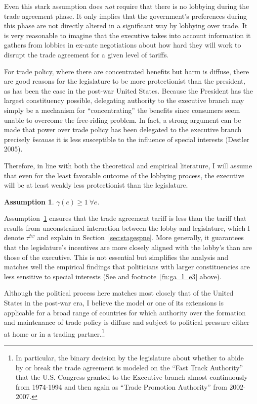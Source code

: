 \documentclass[authoryear, review]{elsarticle}
\newtheorem{assumption}{Assumption}
\newcommand{\ga}{\gamma}
\begin{document}
Even this stark assumption does \textit{not} require that there is no lobbying during the trade agreement phase. It only implies that the government's preferences during this phase are not directly altered in a significant way by lobbying over trade. It is very reasonable to imagine that the executive takes into account information it gathers from lobbies in ex-ante negotiations about how hard they will work to disrupt the trade agreement for a given level of tariffs.

For trade policy, where there are concentrated benefits but harm is diffuse, there are good reasons for the legislature to be more protectionist than the president, as has been the case in the post-war United States. Because the President has the largest constituency possible, delegating authority to the executive branch may simply be a mechanism for ``concentrating'' the benefits since consumers seem unable to overcome the free-riding problem. In fact, a strong argument can be made that power over trade policy has been delegated to the executive branch precisely \textit{because} it is less susceptible to the influence of special interests (Destler 2005). %

Therefore, in line with both the theoretical and empirical literature, I will assume that even for the least favorable outcome of the lobbying process, the executive will be at least weakly less protectionist than the legislature. 

\begin{assumption}
  $\ga(e) \geq 1 \ \forall e$.
  \label{as:ga_l_e3}
\end{assumption}

Assumption~\ref{as:ga_l_e3} ensures that the trade agreement tariff is less than the tariff that results from unconstrained interaction between the lobby and legislature, which I denote $\tau^{tw}$ and explain in Section~\ref{sec:stagespne}. More generally, it guarantees that the legislature's incentives are more closely aligned with the lobby's than are those of the executive. This is not essential but simplifies the analysis and matches well the empirical findings that politicians with larger constituencies are less sensitive to special interests (See \citet{destler} and footnote~\ref{fn:ga_l_e3} above).

Although the political process here matches most closely that of the United States in the post-war era, I believe the model or one of its extensions is applicable for a broad range of countries for which authority over the formation and maintenance of trade policy is diffuse and subject to political pressure either at home or in a trading partner.\footnote{In particular, the binary decision by the legislature about whether to abide by or break the trade agreement is modeled on the ``Fast Track Authority'' that the U.S. Congress granted to the Executive branch almost continuously from 1974-1994 and then again as ``Trade Promotion Authority'' from 2002-2007.} 
\end{document}
